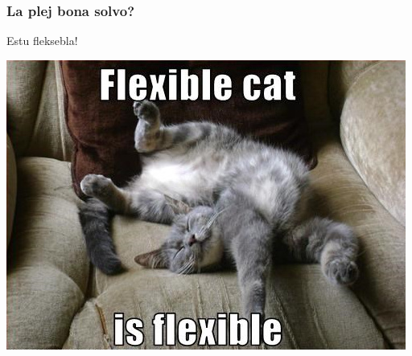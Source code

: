   \begin{frame}
    \frametitle{La plej bona solvo?}
    
    		\begin{center}
    		\begin{block}
    		
			\begin{huge}
				\begin{center}
				Estu \alert{fleksebla}!
				\end{center}
			\end{huge} 
    		\end{block}

			\vspace{1.5em}    		
    		
    		\includegraphics[scale=0.5]{meme/kato}
    		
    		\end{center}

  \end{frame}


